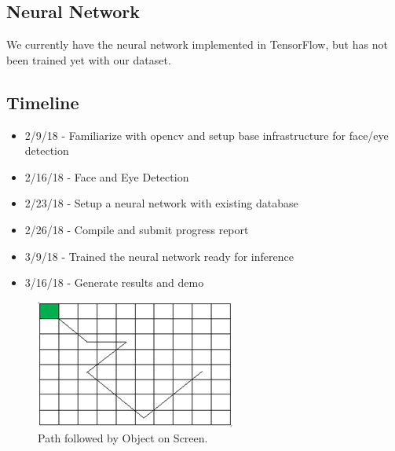 \documentclass[10pt,twocolumn,letterpaper]{article}
\begin{document}
\subsection{Neural Network}
We currently have the neural network implemented in TensorFlow, but
has not been trained yet with our dataset.


\subsection{Timeline}
\begin{itemize}
  \item 2/9/18 - Familiarize with opencv and setup base infrastructure for face/eye detection
  \item 2/16/18 - Face and Eye Detection
  \item 2/23/18 - Setup a neural network with existing database
  \item 2/26/18 - Compile and submit progress report
  \item 3/9/18 - Trained the neural network ready for inference 
  \item 3/16/18 - Generate results and demo
\end{itemize}

\begin{figure}
  \begin{center}
    \includegraphics[width=\linewidth]{original_object_path}
  \end{center}
  \caption{Path followed by Object on Screen.}
  \label{fig:originalpath}
\end{figure}
\end{document}
